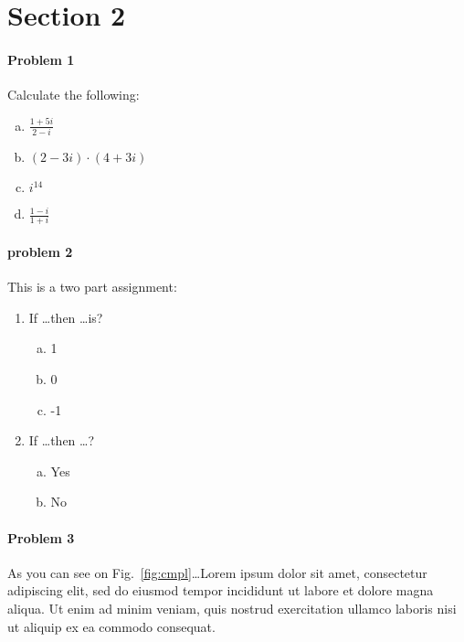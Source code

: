 \documentclass[12pt]{article}
\theoremstyle{mytheor}
\begin{document}

\section{Section 2}

\paragraph{Problem 1}
Calculate the following:
\begin{multicols}{2}
\begin{enumerate}[(a)]
\item $\frac{1+5i}{2-i}$
\item $(2-3i)\cdot(4+3i)$
\item $i^{14}$
\item $\frac{1-i}{1+i}$
\end{enumerate}
\end{multicols}

\paragraph{problem 2}
This is a two part assignment:
\begin{enumerate}
\item If \ldots then \ldots is?
\begin{multicols}{3}
\begin{enumerate}[(a)]
\item 1
\item 0
\item -1
\end{enumerate}
\end{multicols}
\item If \ldots then \ldots ?
\begin{multicols}{2}
\begin{enumerate}[(a)]
\item Yes
\item No
\end{enumerate}
\end{multicols}
\end{enumerate}

\paragraph{Problem 3}
As you can see on Fig.~\ref{fig:cmpl}\ldots Lorem ipsum dolor sit amet, consectetur adipiscing elit, sed do eiusmod tempor incididunt ut labore et dolore magna aliqua. Ut enim ad minim veniam, quis nostrud exercitation ullamco laboris nisi ut aliquip ex ea commodo consequat.
\end{document}
